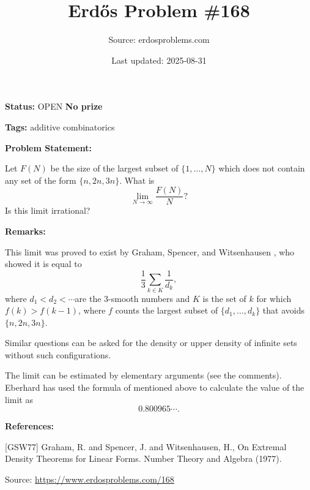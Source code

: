\documentclass{article}
\title{Erd\H{o}s Problem \#168}
\date{Last updated: 2025-08-31}
\author{Source: erdosproblems.com}
\begin{document}
\maketitle

\noindent\textbf{Status:} OPEN \quad \textbf{No prize}

\noindent\textbf{Tags:} additive combinatorics

\medskip
\noindent\textbf{Problem Statement:}

Let $F(N)$ be the size of the largest subset of $\{1,\ldots,N\}$ which does not contain any set of the form $\{n,2n,3n\}$. What is\[ \lim_{N\to \infty}\frac{F(N)}{N}?\]Is this limit irrational?

\bigskip
\noindent\textbf{Remarks:}

This limit was proved to exist by Graham, Spencer, and Witsenhausen \cite{GSW77}, who showed it is equal to\[\frac{1}{3}\sum_{k\in K}\frac{1}{d_k},\]where $d_1<d_2<\cdots $are the $3$-smooth numbers and $K$ is the set of $k$ for which $f(k)>f(k-1)$, where $f$ counts the largest subset of $\{d_1,\ldots,d_k\}$ that avoids $\{n,2n,3n\}$.

Similar questions can be asked for the density or upper density of infinite sets without such configurations.

The limit can be estimated by elementary arguments (see the comments). Eberhard has used the formula of \cite{GSW77} mentioned above to calculate the value of the limit as\[0.800965\cdots.\]

\bigskip
\noindent\textbf{References:}

[GSW77] Graham, R. and Spencer, J. and Witsenhausen, H., On Extremal Density Theorems for Linear Forms. Number Theory and Algebra (1977).

\bigskip
\noindent\small{Source: \url{https://www.erdosproblems.com/168}}
\end{document}
